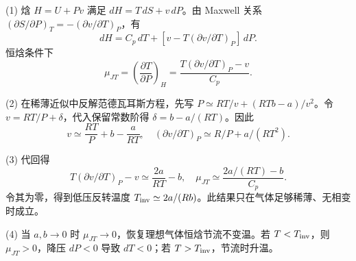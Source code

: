 (1) 焓 \(H=U+Pv\) 满足 \(dH=T\,dS+v\,dP\)。由 Maxwell 关系 \((\partial S/\partial P)_T=-(\partial v/\partial T)_P\)，有
\[
dH=C_p\,dT+[v-T(\partial v/\partial T)_P]\,dP.
\]
恒焓条件下
\[
\mu_{JT}=\left(\frac{\partial T}{\partial P}\right)_H
=\frac{T(\partial v/\partial T)_P-v}{C_p}.
\]

(2) 在稀薄近似中反解范德瓦耳斯方程，先写 \(P\simeq RT/v+(RTb-a)/v^2\)。令 \(v=RT/P+\delta\)，代入保留常数阶得 \(\delta=b-a/(RT)\)。因此
\[
v\simeq\frac{RT}{P}+b-\frac{a}{RT},
\quad
(\partial v/\partial T)_P\simeq R/P+a/(RT^2).
\]

(3) 代回得
\[
T(\partial v/\partial T)_P-v\simeq
\frac{2a}{RT}-b,
\quad
\mu_{JT}\simeq \frac{2a/(RT)-b}{C_p}.
\]
令其为零，得到低压反转温度 \(T_{\rm inv}\simeq2a/(Rb)\)。此结果只在气体足够稀薄、无相变时成立。

(4) 当 \(a,b\to0\) 时 \(\mu_{JT}\to0\)，恢复理想气体恒焓节流不变温。若 \(T<T_{\rm inv}\)，则 \(\mu_{JT}>0\)，降压 \(dP<0\) 导致 \(dT<0\)；若 \(T>T_{\rm inv}\)，节流时升温。
